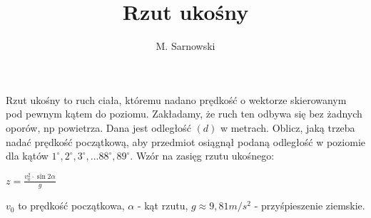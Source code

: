 \documentclass[a4paper,11pt]{article}
\author{M. Sarnowski}
\title{Rzut ukośny}
\begin{document}
\maketitle 
\begin{flushleft}
Rzut ukośny to ruch ciała, któremu nadano prędkość o wektorze skierowanym pod pewnym kątem do poziomu. Zakładamy, że ruch ten odbywa się bez żadnych oporów, np powietrza.
\newline
\newline
Dana jest odległość $(d)$ w metrach.
\newline
\newline
Oblicz, jaką trzeba nadać prędkość początkową, aby przedmiot osiągnął podaną odległość w poziomie dla kątów $1^{\circ}, 2^{\circ}, 3^{\circ}, ... 88^{\circ}, 89^{\circ}$.
\newline
\newline
Wzór na zasięg rzutu ukośnego: 
\begin{Large}
$\textit{z} = \frac{v^{2}_{0} \cdot \sin 2 \alpha}{\textit{g}}$
\end{Large}
\newline
\newline
$v_{0}$ to prędkość początkowa, $\alpha$ - kąt rzutu, $\textit{g} \approx 9,81 m/s^{2}$ - przyśpieszenie ziemskie.
\end{flushleft}
\end{document}
